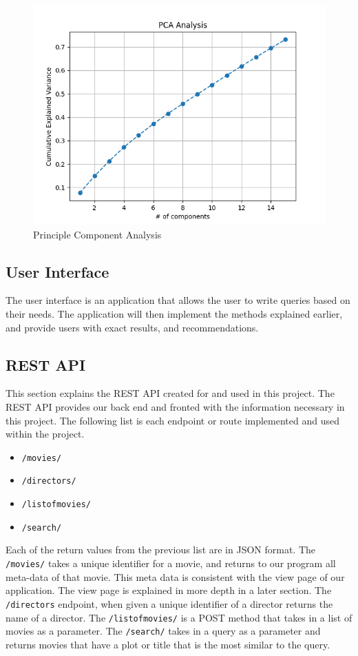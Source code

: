 \documentclass[journal]{IEEEtran}
\theoremstyle{mydefstyle}
\begin{document}
\begin{figure}
    \centering
    \includegraphics[width=1\linewidth]{doc//report//assets/pca_analysis.png}
    \caption{Principle Component Analysis}
    \label{fig:pca}
\end{figure}


\subsection{User Interface}
The user interface is an application that allows the user to write queries based on their needs. The application will then implement the methods explained earlier, and provide users with exact results, and recommendations.

\subsection{REST API}
This section explains the REST API created for and used in this project. The REST API provides our back end and fronted with the information necessary in this project. The following list is each endpoint or route implemented and used within the project.
\begin{itemize}
  \item \texttt{/movies/}
  \item \texttt{/directors/}
  \item \texttt{/listofmovies/}
  \item \texttt{/search/}
\end{itemize}

Each of the return values from the previous list are in JSON format. The\texttt{ /movies/} takes a unique identifier for a movie, and returns to our program all meta-data of that movie. This meta data is consistent with the view page of our application. The view page is explained in more depth in a later section. The \texttt{/directors} endpoint, when given a unique identifier of a director returns the name of a director. The \texttt{/listofmovies/} is a POST method that takes in a list of movies as a parameter. The \texttt{/search/} takes in a query as a parameter and returns movies that have a plot or title that is the most similar to the query.
\end{document}
